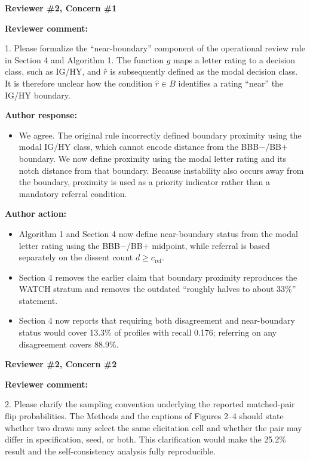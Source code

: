 \documentclass[11pt]{article}
\newcommand{\rvcomment}[1]{{\color{ReviewerGreen}#1}}
\newcommand{\concern}[1]{\textbf{\color{ReviewerGreen}#1}}
\begin{document}
\concern{Reviewer \#2, Concern \#1}

\concern{Reviewer comment:}

\rvcomment{1. Please formalize the ``near-boundary'' component of the operational review rule in
Section 4 and Algorithm 1. The function $g$ maps a letter rating to a decision class, such as
IG/HY, and $\hat r$ is subsequently defined as the modal decision class. It is therefore unclear how
the condition $\hat r \in B$ identifies a rating ``near'' the IG/HY boundary.}

\textbf{Author response:}

\begin{itemize}
\item We agree. The original rule incorrectly defined boundary proximity using the modal IG/HY class,
which cannot encode distance from the BBB$-$/BB$+$ boundary. We now define proximity using the
modal letter rating and its notch distance from that boundary. Because instability also
occurs away from the boundary, proximity is used as a priority indicator rather than a mandatory
referral condition.
\end{itemize}

\textbf{Author action:}

\begin{itemize}
\item Algorithm 1 and Section 4 now define near-boundary status from the modal letter rating
using the BBB$-$/BB$+$ midpoint, while referral is based separately on the dissent count
$d \ge c_{\mathrm{ref}}$.
\item Section 4 removes the earlier claim that boundary proximity reproduces the WATCH
stratum and removes the outdated ``roughly halves to about 33\%'' statement.
\item Section 4 now reports that requiring both disagreement and near-boundary status would
cover 13.3\% of profiles with recall 0.176; referring on any disagreement covers 88.9\%.
\end{itemize}

\vspace{4pt}

\concern{Reviewer \#2, Concern \#2}

\concern{Reviewer comment:}

\rvcomment{2. Please clarify the sampling convention underlying the reported matched-pair flip
probabilities. The Methods and the captions of Figures 2--4 should state whether two draws may
select the same elicitation cell and whether the pair may differ in specification, seed, or both.
This clarification would make the 25.2\% result and the self-consistency analysis fully
reproducible.}
\end{document}
